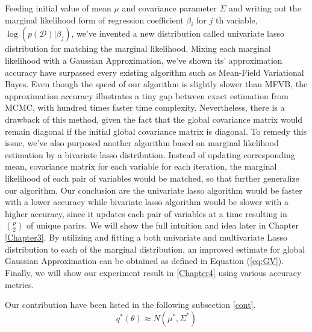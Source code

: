Feeding initial value of mean $\mu$ and covariance parameter $\Sigma$ and writing out the marginal likelihood form of regression coefficient $\beta_i$ for $j$ th variable, $\log(p(\mathcal{D})|\beta_j)$, we've invented a new distribution called univariate lasso distribution for matching the marginal likelihood. Mixing each marginal likelihood with a Gaussian Approximation, we've shown its' approximation accuracy have surpassed every existing algorithm such as Mean-Field Variational Bayes. Even though the speed of our algorithm is slightly slower than MFVB, the approximation accuracy illustrates a tiny gap between exact estimation from MCMC, with hundred times faster time complexity.
Nevertheless, there is a drawback of this method, given the fact that the global covariance matrix would remain diagonal if the initial global covariance matrix is diagonal.
To remedy this issue, we've also purposed another algorithm based on marginal likelihood estimation by a bivariate lasso distribution. Instead of updating corresponding mean, covariance matrix for each variable for each iteration, the marginal likelihood of each pair of variables would be matched, so that further generalize our algorithm. Our conclusion are the univariate lasso algorithm would be faster with a lower accuracy while bivariate lasso algorithm would be slower with a higher accuracy, since it updates each pair of variables at a time resulting in ${p\choose 2}$ of unique parirs. We will show the full intuition and idea later in Chapter \ref{Chapter3}.
By utilizing and fitting a both univariate and multivariate Lasso distribution to each of the marginal distribution, an improved estimate for global Gaussian Approximation can be obtained as defined in Equation (\ref{eq:GV}). Finally, we will show our experiment result in \ref{Chapter4} using various accuracy metrics.

Our contribution have been listed in the following subsection \ref{cont}.
\begin{equation}
	\label{eq:GV}
	q^{*}(\theta) \approx N(\mu^*,\Sigma^*)
\end{equation}

